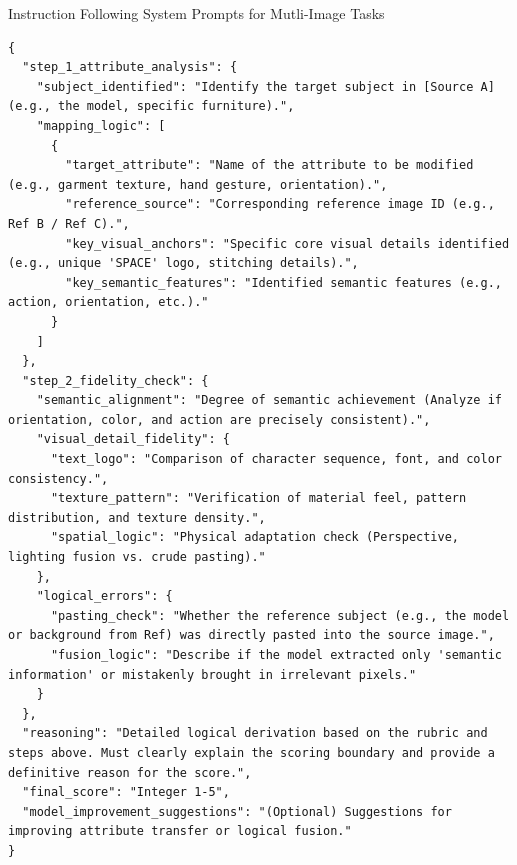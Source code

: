 \begin{promptbox}[label={System Prompts: IF_Multi-Image}]{Instruction Following System Prompts for Mutli-Image Tasks}
\begin{lstlisting}
{
  "step_1_attribute_analysis": {
    "subject_identified": "Identify the target subject in [Source A] (e.g., the model, specific furniture).",
    "mapping_logic": [
      {
        "target_attribute": "Name of the attribute to be modified (e.g., garment texture, hand gesture, orientation).",
        "reference_source": "Corresponding reference image ID (e.g., Ref B / Ref C).",
        "key_visual_anchors": "Specific core visual details identified (e.g., unique 'SPACE' logo, stitching details).",
        "key_semantic_features": "Identified semantic features (e.g., action, orientation, etc.)."
      }
    ]
  },
  "step_2_fidelity_check": {
    "semantic_alignment": "Degree of semantic achievement (Analyze if orientation, color, and action are precisely consistent).",
    "visual_detail_fidelity": {
      "text_logo": "Comparison of character sequence, font, and color consistency.",
      "texture_pattern": "Verification of material feel, pattern distribution, and texture density.",
      "spatial_logic": "Physical adaptation check (Perspective, lighting fusion vs. crude pasting)."
    },
    "logical_errors": {
      "pasting_check": "Whether the reference subject (e.g., the model or background from Ref) was directly pasted into the source image.",
      "fusion_logic": "Describe if the model extracted only 'semantic information' or mistakenly brought in irrelevant pixels."
    }
  },
  "reasoning": "Detailed logical derivation based on the rubric and steps above. Must clearly explain the scoring boundary and provide a definitive reason for the score.",
  "final_score": "Integer 1-5",
  "model_improvement_suggestions": "(Optional) Suggestions for improving attribute transfer or logical fusion."
}
\end{lstlisting}

\end{promptbox}

\clearpage


